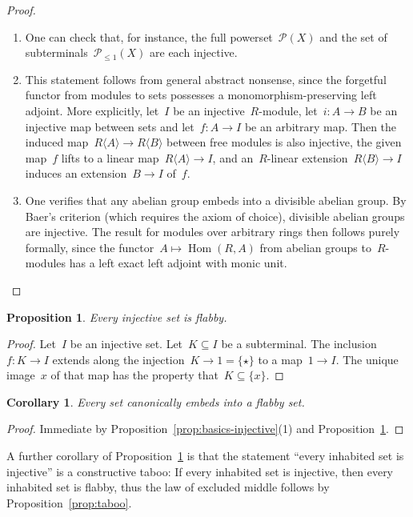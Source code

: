 \documentclass[oneside]{amsart}
\theoremstyle{definition}
\theoremstyle{plain}
\newtheorem{prop}[defn]{Proposition}
\newtheorem{cor}[defn]{Corollary}
\theoremstyle{remark}
\renewcommand{\P}{\mathcal{P}}
\DeclareMathOperator{\Hom}{Hom}
\renewcommand{\_}{\mathpunct{.}\,}
\begin{document}
\begin{proof}\begin{enumerate}
\item One can check that, for instance, the full powerset~$\P(X)$ and the set of
subterminals~$\P_{\leq 1}(X)$ are each injective.
\item This statement follows from general abstract nonsense, since the forgetful functor from modules to sets possesses a monomorphism-preserving left
adjoint. More explicitly, let~$I$ be an injective~$R$-module, let~$i : A \to B$ be an injective map between sets and
let~$f : A \to I$ be an arbitrary map. Then the induced map~$R\langle A \rangle
\to R\langle B \rangle$ between free modules is also injective, the given
map~$f$ lifts to a linear map~$R\langle A \rangle \to I$, and an~$R$-linear
extension~$R\langle B \rangle \to I$ induces an extension~$B \to I$ of~$f$.
\item One verifies that any abelian group embeds into a divisible
abelian group. By Baer's criterion (which requires the axiom of choice), divisible abelian groups are injective.
The result for modules over arbitrary rings then follows purely
formally, since the functor~$A \mapsto \Hom(R,A)$ from abelian groups
to~$R$-modules has a left exact left adjoint with monic unit. \qedhere
\end{enumerate}\end{proof}

\begin{prop}\label{prop:injective-flabby}
Every injective set is flabby.\end{prop}

\begin{proof}Let~$I$ be an injective set. Let~$K \subseteq I$ be a subterminal.
The inclusion~$f : K \to I$ extends along the injection~$K \to 1 = \{\star\}$
to a map~$1 \to I$. The unique image~$x$ of that map has the property that~$K
\subseteq \{x\}$.\end{proof}

\begin{cor}\label{cor:enough-flabby-sets}
Every set canonically embeds into a flabby set.\end{cor}

\begin{proof}Immediate by Proposition~\ref{prop:basics-injective}(1) and
Proposition~\ref{prop:injective-flabby}.\end{proof}

A further corollary of Proposition~\ref{prop:injective-flabby} is that the
statement ``every inhabited set is injective'' is a constructive taboo: If every
inhabited set is injective, then every inhabited set is flabby, thus the law of
excluded middle follows by Proposition~\ref{prop:taboo}.
\end{document}
